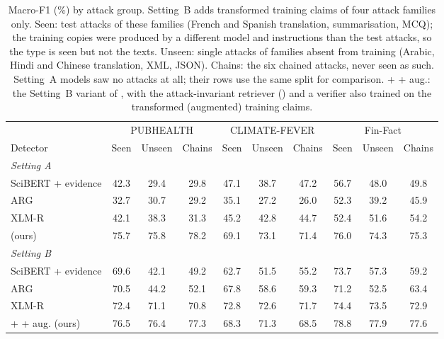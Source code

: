 \begin{table}[t]\centering\small\setlength{\tabcolsep}{5pt}
\begin{adjustbox}{max width=\textwidth}\begin{tabular}{lccccccccc}
\toprule
 & \multicolumn{3}{c}{PUBHEALTH} & \multicolumn{3}{c}{CLIMATE-FEVER} & \multicolumn{3}{c}{Fin-Fact} \\
\cmidrule(lr){2-4} \cmidrule(lr){5-7} \cmidrule(lr){8-10}
Detector & Seen & Unseen & Chains & Seen & Unseen & Chains & Seen & Unseen & Chains \\
\midrule
\multicolumn{10}{l}{\emph{Setting A}} \\
SciBERT + evidence \citep{kotonya2020pubhealth} & 42.3 & 29.4 & 29.8 & 47.1 & 38.7 & 47.2 & 56.7 & 48.0 & 49.8 \\
ARG \citep{hu2024arg} & 32.7 & 30.7 & 29.2 & 35.1 & 27.2 & 26.0 & 52.3 & 39.2 & 45.9 \\
XLM-R \citep{conneau2020xlmr} & 42.1 & 38.3 & 31.3 & 45.2 & 42.8 & 44.7 & 52.4 & 51.6 & 54.2 \\
\method{} (ours) & 75.7 & 75.8 & 78.2 & 69.1 & 73.1 & 71.4 & 76.0 & 74.3 & 75.3 \\
\midrule
\multicolumn{10}{l}{\emph{Setting B}} \\
SciBERT + evidence \citep{kotonya2020pubhealth} & 69.6 & 42.1 & 49.2 & 62.7 & 51.5 & 55.2 & 73.7 & 57.3 & 59.2 \\
ARG \citep{hu2024arg} & 70.5 & 44.2 & 52.1 & 67.8 & 58.6 & 59.3 & 71.2 & 52.5 & 63.4 \\
XLM-R \citep{conneau2020xlmr} & 72.4 & 71.1 & 70.8 & 72.8 & 72.6 & 71.7 & 74.4 & 73.5 & 72.9 \\
\method{} + \air{} + aug. (ours) & 76.5 & 76.4 & 77.3 & 68.3 & 71.3 & 68.5 & 78.8 & 77.9 & 77.6 \\
\bottomrule
\end{tabular}\end{adjustbox}
\caption{Macro-F1 (\%) by attack group. Setting~B adds transformed training claims of four attack families only. Seen: test attacks of these families (French and Spanish translation, summarisation, MCQ); the training copies were produced by a different model and instructions than the test attacks, so the type is seen but not the texts. Unseen: single attacks of families absent from training (Arabic, Hindi and Chinese translation, XML, JSON). Chains: the six chained attacks, never seen as such. Setting~A models saw no attacks at all; their rows use the same split for comparison. \method{} + \air{} + aug.: the Setting~B variant of \method{}, with the attack-invariant retriever (\air{}) and a verifier also trained on the transformed (augmented) training claims.}
\label{tab:seen_unseen}
\end{table}
